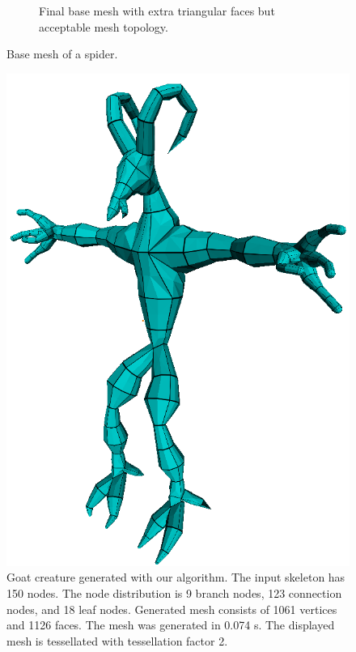 \begin{figure}
\begin{subfigure}[b]{0.4\textwidth}
                \caption{Final base mesh with extra triangular faces but acceptable mesh topology.}
                \label{fig:pavuk_mesh_2}
        \end{subfigure}
        \caption[Base mesh of a spider]{Base mesh of a spider.}\label{fig:pavuk}
\end{figure}

\begin{figure}
    \centering
    \includegraphics[width=\textwidth]{images/goat_1.png}
    \caption[Generated goat creature]{Goat creature generated with our algorithm. The input skeleton has 150 nodes. The node distribution is 9 branch nodes, 123 connection nodes, and 18 leaf nodes. Generated mesh consists of 1061 vertices and 1126 faces. The mesh was generated in 0.074 s. The displayed mesh is tessellated with tessellation factor 2.}
    \label{fig:result_goat}
\end{figure}

